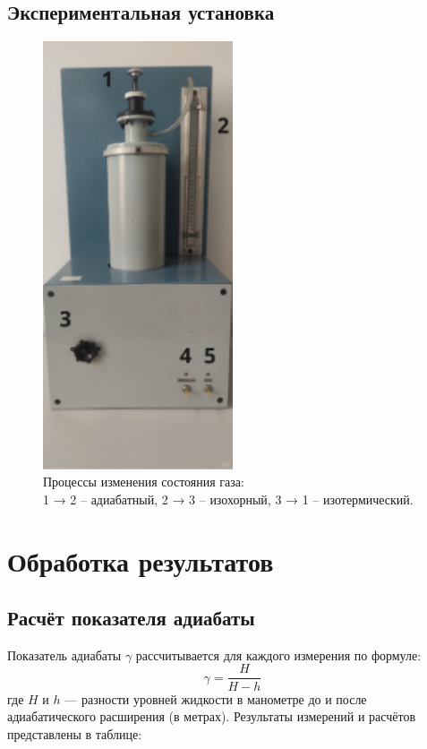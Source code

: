 \documentclass[a4paper]{article}
\begin{document}
\subsection*{Экспериментальная установка}
\begin{figure}[H]
\begin{center}
\includegraphics[width=0.5\textwidth]{fig_1}
\caption{ Процессы изменения состояния газа: \\
1 → 2 – адиабатный, 2 → 3 – изохорный, 3 → 1 – изотермический.
}
\end{center}
\end{figure}


\section{Обработка результатов}

\subsection{Расчёт показателя адиабаты}
Показатель адиабаты \(\gamma\) рассчитывается для каждого измерения по формуле:
\[
\gamma = \frac{H}{H - h}
\]
где \(H\) и \(h\) — разности уровней жидкости в манометре до и после адиабатического расширения (в метрах). Результаты измерений и расчётов представлены в таблице:
\end{document}
